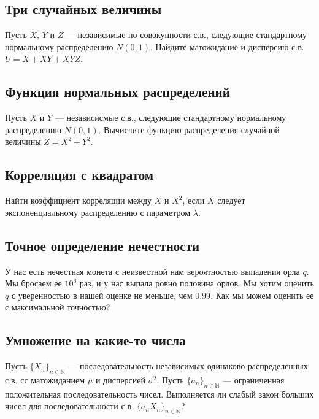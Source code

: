 \documentclass[12pt]{article}
\newcommand\N{\mathbb{N}}
\begin{document}
\subsection{Три случайных величины}

Пусть $X$, $Y$ и $Z$ --- независимые по совокупности с.в., следующие стандартному нормальному распределению $N(0, 1)$. Найдите матожидание и дисперсию с.в. $U = X + XY + XYZ$. 



\subsection{Функция нормальных распределений}

Пусть $X$ и $Y$ --- независисмые с.в., следующие стандартному нормальному распределению $N(0, 1)$. Вычислите функцию распределения случайной величины $Z = X^2 + Y^2$.



\subsection{Корреляция с квадратом}

Найти коэффициент корреляции между $X$ и $X^2$, если $X$ следует экспоненциальному распределению с параметром $\lambda$.



\subsection{Точное определение нечестности}

У нас есть нечестная монета с неизвестной нам вероятностью выпадения орла $q$. Мы бросаем ее $10^6$ раз, и у нас выпала ровно половина орлов. Мы хотим оценить $q$ с уверенностью в нашей оценке не меньше, чем $0.99$. Как мы можем оценить ее с максимальной точностью? 



\subsection{Умножение на какие-то числа}

Пусть $\{X_n\}_{n \in \N}$ --- последовательность независимых одинаково распределенных с.в. сс матожиданием $\mu$ и дисперсией $\sigma^2$. Пусть $\{a_n\}_{n \in \N}$ --- ограниченная положительная последовательность чисел. Выполняется ли слабый закон больших чисел для последовательности с.в. $\{a_n X_n\}_{n \in \N}$?
\end{document}
